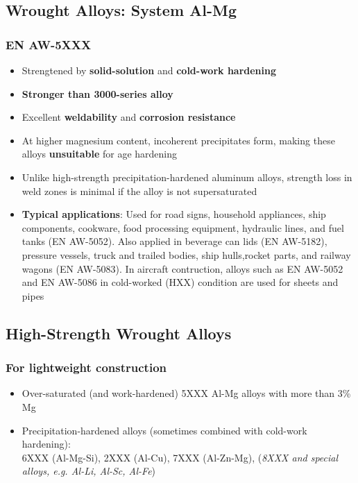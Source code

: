 \documentclass{article}
\begin{document}
\subsection{Wrought Alloys: System Al-Mg}
\subsubsection{EN AW-5XXX}
\begin{itemize}
  \item Strengtened by \textbf{solid-solution} and \textbf{cold-work hardening}
  \item \textbf{Stronger than 3000-series alloy}
  \item Excellent \textbf{weldability} and \textbf{corrosion resistance}
  \item At higher magnesium content, incoherent precipitates form, making these alloys \textbf{unsuitable} for age hardening
  \item Unlike high-strength precipitation-hardened aluminum alloys, strength loss in weld zones is minimal if the alloy is not supersaturated
  \item \textbf{Typical applications}: Used for road signs, household appliances, ship components, cookware, food processing equipment, hydraulic lines, and fuel tanks (EN AW-5052).
    Also applied in beverage can lids (EN AW-5182), pressure vessels, truck and trailed bodies, ship hulls,rocket parts, and railway wagons (EN AW-5083).
    In aircraft contruction, alloys such as EN AW-5052 and EN AW-5086 in cold-worked (HXX) condition are used for sheets and pipes
\end{itemize}

\subsection{High-Strength Wrought Alloys}
\subsubsection{For lightweight construction}
\begin{itemize}
  \item Over-saturated (and work-hardened) 5XXX Al-Mg alloys with more than 3\% Mg
  \item Precipitation-hardened alloys (sometimes combined with cold-work hardening):\\
    6XXX (Al-Mg-Si), 2XXX (Al-Cu), 7XXX (Al-Zn-Mg), (\textit{8XXX and special alloys, e.g. Al-Li, Al-Sc, Al-Fe})
\end{itemize}
\end{document}
